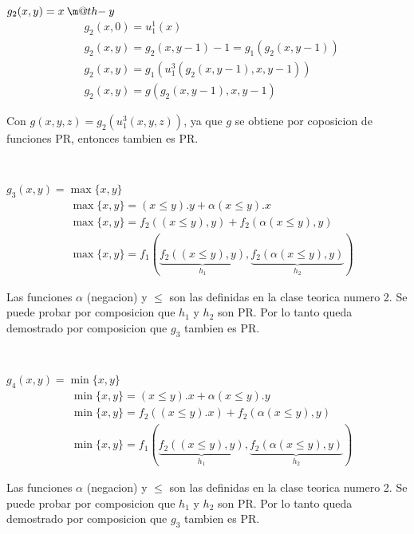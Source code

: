 \documentclass{report}
\makeatletter
\newcommand{\dotminus}{\mathbin{\text{\@dotminus}}}
\newcommand{\@dotminus}{%
  \ooalign{\hidewidth\raise1ex\hbox{.}\hidewidth\cr$\m@th-$\cr}%
}
\makeatother
\begin{document}
~

\sol
$g_2(x,y)=x \dotminus y$
\begin{align*}
	&g_{2}(x,0)=u_{1}^{1}(x)\\
	&g_{2}(x,y)=g_{2}(x,y-1)-1=g_{1}(g_{2}(x,y-1))\\
	&g_{2}(x,y)=g_{1}(u_{1}^{3}(g_{2}(x,y-1),x,y-1))\\
	&g_{2}(x,y)=g(g_{2}(x,y-1),x,y-1)
\end{align*}

Con $g(x,y,z) = g_2(u_1^3(x,y,z))$, ya que $g$ se obtiene por coposicion de funciones PR, entonces tambien es PR.

~

\sol
$g_3(x,y)=\max\{x,y\}$
\begin{align*}
	&\max\{x,y\}=(x\leqslant y).y+\alpha(x\leqslant y).x\\
	&\max\{x,y\}=f_{2}((x\leqslant y),y)+f_{2}(\alpha(x\leqslant y),y)\\
	&\max\{x,y\}=f_{1}(\underbrace{f_{2}((x\leqslant y),y)}_{h_{1}},\underbrace{f_{2}(\alpha(x\leqslant y),y)}_{h_{2}})
\end{align*}

Las funciones $\alpha$ (negacion) y $\leq$ son las definidas en la clase teorica numero 2.
Se puede probar por composicion que $h_1$ y $h_2$ son PR. Por lo tanto queda demostrado por composicion que $g_3$ tambien es PR.

~

\sol
$g_4(x,y)=\min\{x,y\}$
\begin{align*}
	&\min\{x,y\}=(x\leqslant y).x+\alpha(x\leqslant y).y\\
	&\min\{x,y\}=f_{2}((x\leqslant y).x)+f_{2}(\alpha(x\leqslant y),y)\\
	&\min\{x,y\}=f_{1}(\underbrace{f_{2}((x\leqslant y),y)}_{h_{1}},\underbrace{f_{2}(\alpha(x\leqslant y),y)}_{h_{2}})
\end{align*}

Las funciones $\alpha$ (negacion) y $\leq$ son las definidas en la clase teorica numero 2.
Se puede probar por composicion que $h_1$ y $h_2$ son PR. Por lo tanto queda demostrado por composicion que $g_3$ tambien es PR.
\end{document}
